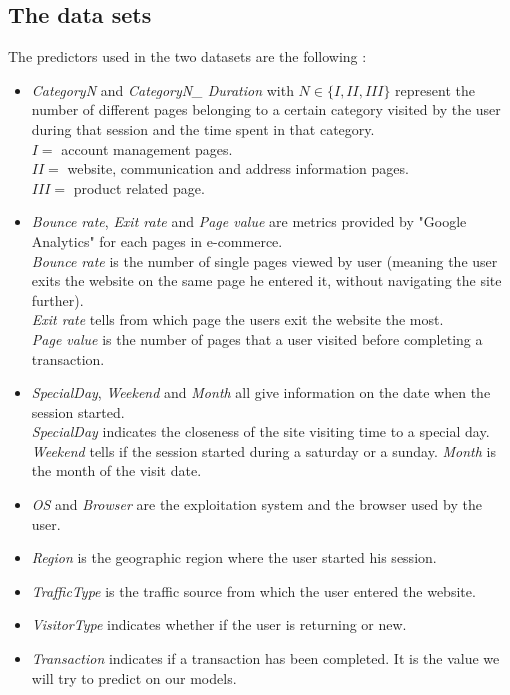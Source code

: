 \documentclass[11pt]{article}
\begin{document}
\subsection*{The data sets}
The predictors used in the two datasets are the following :
\begin{itemize}
\item \emph{CategoryN} and \emph{CategoryN\_ Duration} with $N\in \{ I, II, III\} $ represent the number of different pages belonging to a certain category visited by the user during that session and the time spent in that category.\\
$I=$ account management pages.\\
$II=$ website, communication and address information pages.\\
$III=$ product related page. 
\item \emph{Bounce rate}, \emph{Exit rate} and \emph{Page value} are metrics provided by "Google Analytics" for each pages in e-commerce.\\
\emph{Bounce rate} is the number of single pages viewed by user (meaning the user exits the website on the same page he entered it, without navigating the site further).\\
\emph{Exit rate} tells from which page the users exit the website the most.\\
\emph{Page value} is the number of pages that a user visited before completing a transaction.
\item \emph{SpecialDay}, \emph{Weekend} and \emph{Month} all give information on the date when the session started.\\
\emph{SpecialDay} indicates the closeness of the site visiting time to a special day.\\
\emph{Weekend} tells if the session started during a saturday or a sunday.
\emph{Month} is the month of the visit date.
\item \emph{OS} and \emph{Browser} are the exploitation system and the browser used by the user.
\item \emph{Region} is the geographic region where the user started his session.
\item \emph{TrafficType} is the traffic source from which the user entered the website.
\item \emph{VisitorType} indicates whether if the user is returning or new.
\item \emph{Transaction} indicates if a transaction has been completed. It is the value we will try to predict on our models.
\end{itemize} 
\end{document}
